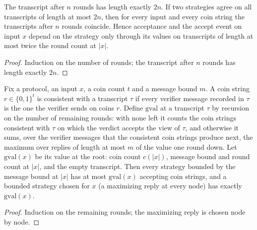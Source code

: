 \begin{lemma}
  \label{lem:interaction-strategy-ext}
  \leanok
  The transcript after $n$ rounds has length exactly $2n$. If two strategies
  agree on all transcripts of length at most $2n$, then for every input and
  every coin string the transcripts after $n$ rounds coincide. Hence
  acceptance and the accept event on input $x$ depend on the strategy only
  through its values on transcripts of length at most twice the round count
  at $|x|$.
\end{lemma}
\begin{proof}
  \leanok
  Induction on the number of rounds; the transcript after $n$ rounds has
  length exactly $2n$.
\end{proof}

\begin{lemma}
  \label{lem:interaction-game-value}
  \leanok
  Fix a protocol, an input $x$, a coin count $t$ and a message bound $m$. A
  coin string $r \in \{0,1\}^t$ is consistent with a transcript $\tau$ if
  every verifier message recorded in $\tau$ is the one the verifier sends on
  coins $r$. Define $\mathrm{gval}$ at a transcript $\tau$ by recursion on the
  number of remaining rounds: with none left it counts the coin strings
  consistent with $\tau$ on which the verdict accepts the view of $\tau$, and
  otherwise it sums, over the verifier messages that the consistent coin
  strings produce next, the maximum over replies of length at most $m$ of the
  value one round down. Let $\mathrm{gval}(x)$ be its value at the root: coin
  count $c(|x|)$, message bound and round count at $|x|$, and the empty
  transcript. Then every strategy bounded by the message bound at $|x|$ has at
  most $\mathrm{gval}(x)$ accepting coin strings, and a bounded strategy
  chosen for $x$ (a maximizing reply at every node) has exactly
  $\mathrm{gval}(x)$.
\end{lemma}
\begin{proof}
  \leanok
  Induction on the remaining rounds; the maximizing reply is chosen
  node by node.
\end{proof}

